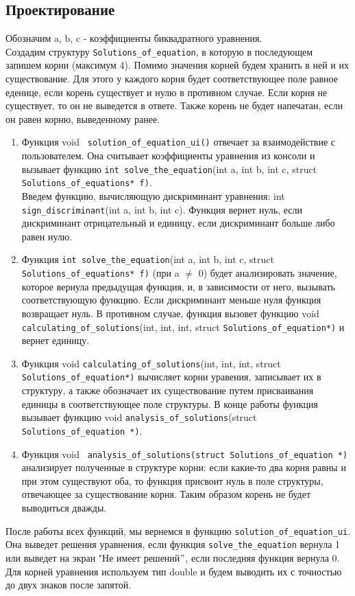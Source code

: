 \documentclass[12pt,a4paper]{report}
\begin{document}
\subsection{Проектирование}
Обозначим a, b, c - коэффициенты биквадратного уравнения. \\
Создадим структуру \verb+Solutions_of_equation+, в которую в последующем запишем корни (максимум 4). Помимо значения корней будем хранить в ней и их существование. Для этого у каждого корня будет соответствующее поле равное еденице, если корень существует и нулю в противном случае. Если корня не существует, то он не выведется в ответе. Также корень не будет напечатан, если он равен корню, выведенному ранее. \\
\begin{enumerate}
\item
Функция void \verb+ solution_of_equation_ui()+ отвечает за взаимодействие с пользователем. Она считывает коэффициенты уравнения из консоли и вызывает функцию \verb+int solve_the_equation+(int a, int b, int c, struct \verb+Solutions_of_equations* f)+.  \\
Введем функцию, вычисляющую дискриминант уравнения: int \verb+sign_discriminant+(int a, int b, int c). Функция вернет нуль, если дискриминант отрицательный и единицу, если дискриминант больше либо равен нулю. \\
\item
Функция  \verb+int solve_the_equation+(int a, int b, int c, struct \verb+Solutions_of_equations* f)+ (при a $\neq$ 0) будет анализировать значение, которое вернула предыдущая функция, и, в  зависимости от него, вызывать соответствующую функцию. Если дискриминант меньше нуля функция возвращает нуль. В противном случае, функция вызовет функцию void \verb+ calculating_of_solutions+(int, int, int, struct \verb+Solutions_of_equation*)+ и вернет единицу. 
\item
Функция void \verb+calculating_of_solutions+(int, int, int, struct \verb+Solutions_of_equation*)+ вычисляет корни уравения, записывает их в структуру, а также обозначает их существование путем присваивания единицы в соответствующее поле структуры. В конце работы функция вызывает функцию void \verb+analysis_of_solutions+(struct \verb+Solutions_of_equation *)+. \\
\item
Функция void \verb+ analysis_of_solutions(struct Solutions_of_equation *)+ анализирует полученные в структуре корни: если какие-то два корня равны и при этом существуют оба, то функция присвоит нуль в поле структуры, отвечающее за существование корня. Таким образом корень не будет выводиться дважды. \\
\end{enumerate}
После работы всех функций, мы вернемся в функцию \verb+solution_of_equation_ui+. Она выведет решения уравнения, если функция \verb+solve_the_equation+ вернула 1 или выведет на экран "Не имеет решений$"$, если последняя функция вернула 0. \\
Для корней уравнения используем тип double и будем выводить их с точностью до двух знаков после запятой. 
\end{document}
